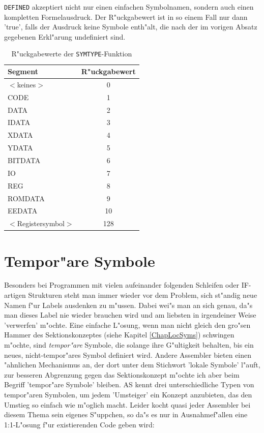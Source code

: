 \documentclass[12pt,a4paper,twoside]{report}
\newcommand{\tty}[1]{{\tt #1}}
\newcommand{\asname}{AS}
\begin{document}
\tty{DEFINED} akzeptiert nicht nur einen einfachen Symbolnamen, sondern auch
einen kompletten Formelausdruck.  Der R"uckgabewert ist in so einem Fall
nur dann 'true', falls der Ausdruck keine Symbole enth"alt, die nach der im
vorigen Absatz gegebenen Erkl"arung undefiniert sind.
\begin{table}[htb]
\begin{center}
\begin{tabular}{|l|c|}
\hline
Segment & R"uckgabewert \\
\hline
$<$keines$>$ & 0 \\
CODE & 1 \\
DATA & 2 \\
IDATA & 3 \\
XDATA & 4 \\
YDATA & 5 \\
BITDATA & 6 \\
IO & 7 \\
REG & 8 \\
ROMDATA & 9 \\
EEDATA & 10 \\
$<$Registersymbol$>$ & 128 \\
\hline
\end{tabular}
\end{center}
\caption{R"uckgabewerte der \tty{SYMTYPE}-Funktion\label{TabSegNums}}
\end{table}


\section{Tempor"are Symbole}

Besonders bei Programmen mit vielen aufeinander folgenden Schleifen oder
IF-artigen Strukturen steht man immer wieder vor dem Problem, sich
st"andig neue Namen f"ur Labels ausdenken zu m"ussen.  Dabei wei"s man an
sich genau, da"s man dieses Label nie wieder brauchen wird und am liebsten
in irgendeiner Weise 'verwerfen' m"ochte.  Eine einfache L"osung, wenn man
nicht gleich den gro"sen Hammer des Sektionskonzeptes (siehe Kapitel
\ref{ChapLocSyms}) schwingen m"ochte, sind {\em tempor"are} Symbole, die
solange ihre G"ultigkeit behalten, bis ein neues, nicht-tempor"ares Symbol
definiert wird.  Andere Assembler bieten einen "ahnlichen Mechanismus an,
der dort unter dem Stichwort 'lokale Symbole' l"auft, zur besseren
Abgrenzung gegen das Sektionskonzept m"ochte ich aber beim Begriff
'tempor"are Symbole' bleiben.  \asname{} kennt drei unterschiedliche Typen von
tempor"aren Symbolen, um jedem 'Umsteiger' ein Konzept anzubieten, das den
Umstieg so einfach wie m"oglich macht.  Leider kocht quasi jeder Assembler
bei diesem Thema sein eigenes S"uppchen, so da"s es nur in Ausnahmef"allen
eine 1:1-L"osung f"ur existierenden Code geben wird:
\end{document}
